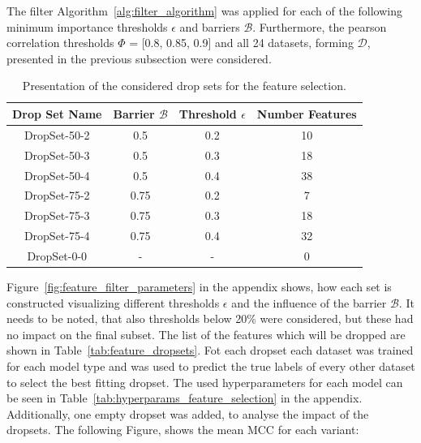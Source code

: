 The filter Algorithm~\ref{alg:filter_algorithm} was applied for each of the following minimum importance thresholds
$\epsilon$ and barriers $\mathcal{B}$. Furthermore, the pearson correlation thresholds $\Phi$ = [0.8, 0.85, 0.9] and
all 24 datasets, forming $\mathcal{D}$, presented in the previous subsection were considered.
\begin{table}[ht]
    \centering
    \begin{tabular}{c c c c}
        \toprule
        Drop Set Name & Barrier $\mathcal{B}$ & Threshold $\epsilon$ & Number Features \\
        \midrule
        DropSet-50-2  & 0.5                   & 0.2                  & 10              \\
        DropSet-50-3  & 0.5                   & 0.3                  & 18              \\
        DropSet-50-4  & 0.5                   & 0.4                  & 38              \\
        DropSet-75-2  & 0.75                  & 0.2                  & 7               \\
        DropSet-75-3  & 0.75                  & 0.3                  & 18              \\
        DropSet-75-4  & 0.75                  & 0.4                  & 32              \\\hline
        DropSet-0-0   & -                     & -                    & 0               \\
        \bottomrule
    \end{tabular}
    \caption{Presentation of the considered drop sets for the feature selection.}
    \label{tab:drop_set_presentation_shortened}
\end{table}

Figure~\ref{fig:feature_filter_parameters} in the appendix shows, how each set is constructed visualizing
different thresholds $\epsilon$ and the influence of the barrier $\mathcal{B}$. It needs to be noted, that
also thresholds below 20\% were considered, but these had no impact on the final subset. The list of the
features which will be dropped are shown in Table~\ref{tab:feature_dropsets}. Fot each dropset each dataset was trained
for each model type and was used to predict the true labels of every other dataset to select the best fitting dropset.
The used hyperparameters for each model can be seen in Table~\ref{tab:hyperparams_feature_selection} in the appendix.
Additionally, one empty dropset was added, to analyse the impact of the dropsets. The following Figure, shows the mean \gls{MCC}
for each variant:

